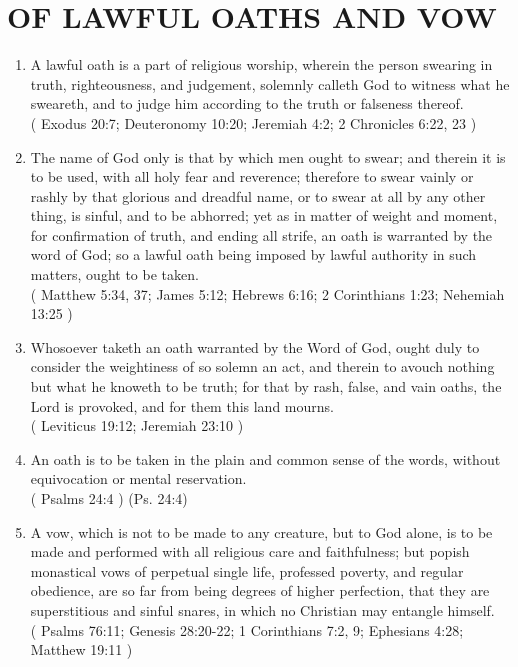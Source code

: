 \documentclass[12pt,a4paper]{book}
\begin{document}
\chapter{OF LAWFUL OATHS AND VOW}
\label{ch-law-oat-vow}
\begin{enumerate}
\item A lawful oath is a part of religious worship, wherein the person swearing in truth, righteousness, and judgement, solemnly calleth God to witness what he sweareth, and to judge him according to the truth or falseness thereof.\\
( Exodus 20:7; Deuteronomy 10:20; Jeremiah 4:2; 2 Chronicles 6:22, 23 )
\item The name of God only is that by which men ought to swear; and therein it is to be used, with all holy fear and reverence; therefore to swear vainly or rashly by that glorious and dreadful name, or to swear at all by any other thing, is sinful, and to be abhorred; yet as in matter of weight and moment, for confirmation of truth, and ending all strife, an oath is warranted by the word of God; so a lawful oath being imposed by lawful authority in such matters, ought to be taken.\\
( Matthew 5:34, 37; James 5:12; Hebrews 6:16; 2 Corinthians 1:23; Nehemiah 13:25 )
\item Whosoever taketh an oath warranted by the Word of God, ought duly to consider the weightiness of so solemn an act, and therein to avouch nothing but what he knoweth to be truth; for that by rash, false, and vain oaths, the Lord is provoked, and for them this land mourns.\\
( Leviticus 19:12; Jeremiah 23:10 )
\item An oath is to be taken in the plain and common sense of the words, without equivocation or mental reservation.\\
( Psalms 24:4 ) (Ps. 24:4)
\item A vow, which is not to be made to any creature, but to God alone, is to be made and performed with all religious care and faithfulness; but popish monastical vows of perpetual single life, professed poverty, and regular obedience, are so far from being degrees of higher perfection, that they are superstitious and sinful snares, in which no Christian may entangle himself.\\
( Psalms 76:11; Genesis 28:20-22; 1 Corinthians 7:2, 9; Ephesians 4:28; Matthew 19:11 )
\end{enumerate}
\end{document}
